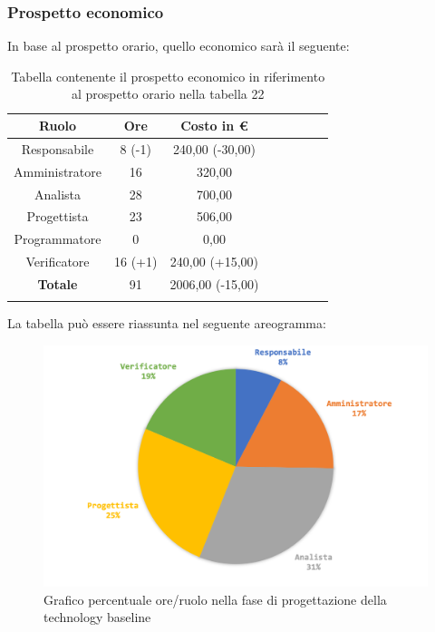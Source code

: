		\subsubsection{Prospetto economico}
			In base al prospetto orario, quello economico sarà il seguente: 
			
			\begin{longtable}{|c|c|c|c|c|c|c|c}
				\hline
				\rowcolor{lighter-grayer}
				\textbf{Ruolo} & \textbf{Ore} & \textbf{Costo in €} \\
				\hline
				\endfirsthead
				\hline
			Responsabile 	    & 8 (-1) & 240,00 (-30,00)\\
			\hline 
			\hline
			Amministratore	  & 16 & 320,00\\
			\hline
			\hline
			Analista 				& 28 & 700,00\\
			\hline
			\hline
			Progettista 		  & 23 & 506,00\\
			\hline
			\hline
			Programmatore 	 & 0 & 0,00\\
			\hline
			\hline
			Verificatore 		  & 16 (+1) & 240,00 (+15,00)\\
			\hline
			\textbf{Totale} 	& 91 & 2006,00 (-15,00)\\
			\hline
				
				\caption{Tabella contenente il prospetto economico in riferimento al prospetto orario nella tabella 22}
			\end{longtable}
			\pagebreak
			
			La tabella può essere riassunta nel seguente areogramma:
			\begin{figure}[H]
				\centering
				\includegraphics[width=0.8\linewidth]{images/consuntivo/ConsCorrez2.png}
				\caption{Grafico percentuale ore/ruolo nella fase di progettazione della technology baseline}
				\label{fig:grafico costi ruolo fase progettazione della technology baseline}
			\end{figure}
				
